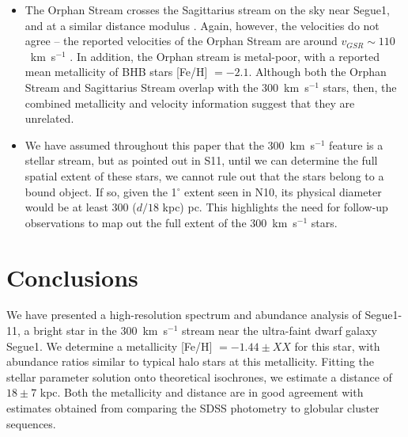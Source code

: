 \documentclass{emulateapj}
\begin{document}
\begin{itemize}
\item The Orphan Stream \citep{Belokurov2007b} crosses the Sagittarius stream on the sky near Segue1, and at a similar distance modulus . Again, however, the velocities do not agree -- the reported velocities of the Orphan Stream are around $v_{GSR} \sim 110$~km~s$^{-1}$ \citep{Newberg2010}. In addition, the Orphan stream is metal-poor, with a reported mean metallicity of BHB stars [Fe/H] $ = -2.1$. Although both the Orphan Stream and Sagittarius Stream overlap with the 300~km~s$^{-1}$ stars, then, the combined metallicity and velocity information suggest that they are unrelated.

\item We have assumed throughout this paper that the 300~km~s$^{-1}$ feature is a stellar stream, but as pointed out in S11, until we can determine the full spatial extent of these stars, we cannot rule out that the stars belong to a bound object. If so, given the 1$^{\circ}$ extent seen in N10, its physical diameter would be at least 300 ($d / 18$ kpc) pc. This highlights the need for follow-up observations to map out the full extent of the 300~km~s$^{-1}$ stars.


\end{itemize}





\section{Conclusions}
\label{sec:conc}
We have presented a high-resolution spectrum and abundance analysis of Segue1-11, a bright star in the 300~km~s$^{-1}$ stream near the ultra-faint dwarf galaxy Segue1. We determine a metallicity [Fe/H] $= -1.44 \pm XX$ for this star, with abundance ratios similar to typical halo stars at this metallicity. Fitting the stellar parameter solution onto theoretical isochrones, we estimate a distance of $18 \pm 7$ kpc. Both the metallicity and distance are in good agreement with estimates obtained from comparing the SDSS photometry to globular cluster sequences.
\end{document}
